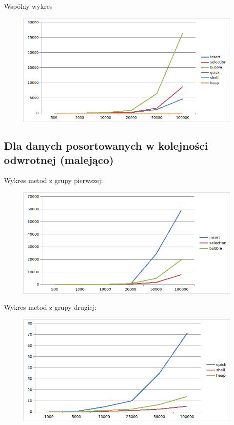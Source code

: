 \documentclass{article}
\begin{document}
Wspólny wykres
\begin{figure}[H]
    \centering
    \includegraphics[width=\textwidth]{"../assets/1_3.png"}
    \label{fig:1_3}
\end{figure}
\subsection*{Dla danych posortowanych w kolejności odwrotnej (malejąco)}
Wykres metod z grupy pierwszej:
\begin{figure}[H]
    \centering
    \includegraphics[width=\textwidth]{"../assets/2_1.png"}
    \label{fig:2_1}
\end{figure}


Wykres metod z grupy drugiej:
\begin{figure}[H]
    \centering
    \includegraphics[width=\textwidth]{"../assets/2_2.png"}
    \label{fig:2_2}
\end{figure}
\end{document}
